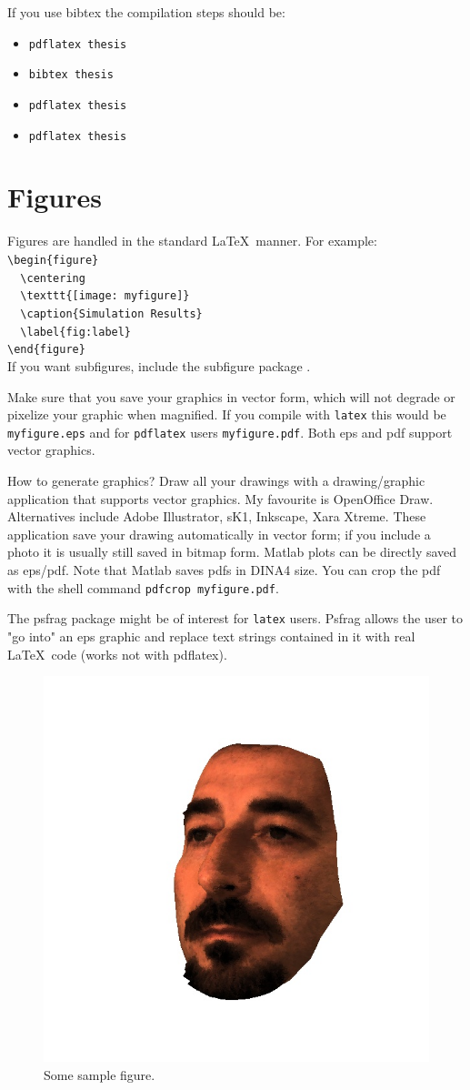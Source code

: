 If you use bibtex the compilation steps should be: 
\begin{itemize}
	\item \verb'pdflatex thesis'
	\item \verb'bibtex thesis'
	\item \verb'pdflatex thesis'
	\item \verb'pdflatex thesis'
\end{itemize}
%
%
%
\section{Figures}
\label{sec:figures}                                     
Figures are handled in the standard \LaTeX\ manner. For example: \\
\verb'\begin{figure}'\\
\verb'  \centering'\\
\verb'  \texttt{[image: myfigure]}'\\
\verb'  \caption{Simulation Results}'\\
\verb'  \label{fig:label}'\\
\verb'\end{figure}'\\
If you want subfigures, include the subfigure package \verb''.

Make sure that you save your graphics in vector form, which will not degrade or pixelize your graphic when magnified. If you compile with \verb'latex' this would be \verb'myfigure.eps' and for \verb'pdflatex' users \verb'myfigure.pdf'. Both eps and pdf support vector graphics. 

How to generate graphics? Draw all your drawings with a drawing/graphic application that supports vector graphics. 
My favourite is OpenOffice Draw. Alternatives include Adobe Illustrator, sK1, Inkscape, Xara Xtreme. 
These application save your drawing automatically in vector form; if you include a photo it is usually still saved in bitmap form.
Matlab plots can be directly saved as eps/pdf. Note that Matlab saves pdfs in DINA4 size. You can crop the pdf with the shell command \verb'pdfcrop myfigure.pdf'. 

The psfrag package might be of interest for \verb'latex' users. Psfrag allows the user to "go into" an eps graphic and replace text
strings contained in it with real \LaTeX\ code (works not with pdflatex). 

\begin{figure}[htb]
	\centering
	\includegraphics[width=0.35\linewidth]{figures/figure}
	\caption{Some sample figure.}
	\label{fig:sample}
\end{figure}

